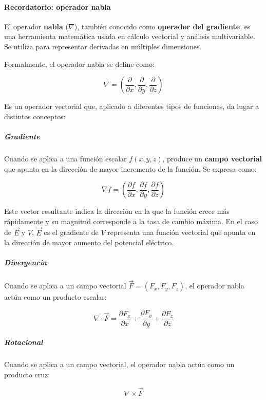\paragraph{Recordatorio: operador nabla}

El operador \textbf{nabla} (\(\nabla\)), también conocido como \textbf{operador del gradiente}, es una herramienta matemática usada en cálculo vectorial y análisis multivariable. Se utiliza para representar derivadas en múltiples dimensiones.

Formalmente, el operador nabla se define como:

\[
\nabla = \left( \frac{\partial}{\partial x}, \frac{\partial}{\partial y}, \frac{\partial}{\partial z} \right)
\]

Es un operador vectorial que, aplicado a diferentes tipos de funciones, da lugar a distintos conceptos:

\subparagraph{Gradiente}

Cuando se aplica a una función escalar \( f(x, y, z) \), produce un \textbf{campo vectorial} que apunta en la dirección de mayor incremento de la función. Se expresa como:

\[
\nabla f = \left( \frac{\partial f}{\partial x}, \frac{\partial f}{\partial y}, \frac{\partial f}{\partial z} \right)
\]

Este vector resultante indica la dirección en la que la función crece más rápidamente y su magnitud corresponde a la tasa de cambio máxima. En el caso de \(\vec{E}\) y \(V\), \(\vec{E}\) es el gradiente de \(V\) representa una función vectorial que apunta en la dirección de mayor aumento del potencial eléctrico.

\subparagraph{Divergencia}

Cuando se aplica a un campo vectorial \( \vec{F} = (F_x, F_y, F_z) \), el operador nabla actúa como un producto escalar:

\[
\nabla \cdot \vec{F} = \frac{\partial F_x}{\partial x} + \frac{\partial F_y}{\partial y} + \frac{\partial F_z}{\partial z}
\]

\subparagraph{Rotacional}

Cuando se aplica a un campo vectorial, el operador nabla actúa como un producto cruz:

\[
\nabla \times \vec{F}
\]

